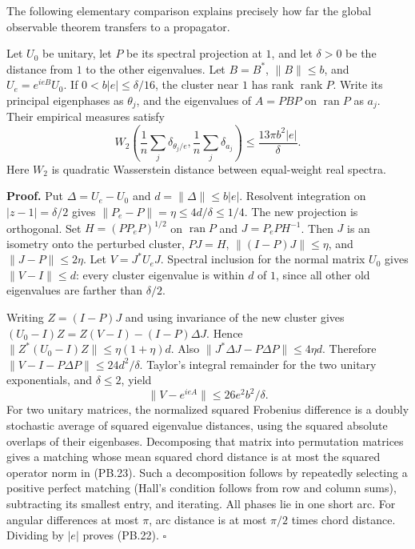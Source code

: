 The following elementary comparison explains precisely how far the global observable theorem transfers to a propagator.

\begin{lemma}\label{pass1:pell_blocks-3} Let \(U_0\) be unitary, let \(P\) be its spectral projection at \(1\), and let \(\delta>0\) be the distance from \(1\) to the other eigenvalues. Let \(B=B^*\), \(\|B\|\leq b\), and \(U_e=e^{ieB}U_0\). If \(0<b|e|\leq\delta/16\), the cluster near \(1\) has rank \(\operatorname{rank}P\). Write its principal eigenphases as \(\theta_j\), and the eigenvalues of \(A=PBP\) on \(\operatorname{ran}P\) as \(a_j\). Their empirical measures satisfy \[
 W_2\left(\frac1n\sum_j\delta_{\theta_j/e},
          \frac1n\sum_j\delta_{a_j}\right)
 \leq\frac{13\pi b^2|e|}{\delta}. \tag{PB.22}
\] Here \(W_2\) is quadratic Wasserstein distance between equal-weight real spectra.
\end{lemma}

\textbf{Proof.} Put \(\Delta=U_e-U_0\) and \(d=\|\Delta\|\leq b|e|\). Resolvent integration on \(|z-1|=\delta/2\) gives \(\|P_e-P\|=\eta\leq4d/\delta\leq1/4\). The new projection is orthogonal. Set \(H=(PP_eP)^{1/2}\) on \(\operatorname{ran}P\) and \(J=P_ePH^{-1}\). Then \(J\) is an isometry onto the perturbed cluster, \(PJ=H\), \(\|(I-P)J\|\leq\eta\), and \(\|J-P\|\leq2\eta\). Let \(V=J^*U_eJ\). Spectral inclusion for the normal matrix \(U_0\) gives \(\|V-I\|\leq d\): every cluster eigenvalue is within \(d\) of \(1\), since all other old eigenvalues are farther than \(\delta/2\).

Writing \(Z=(I-P)J\) and using invariance of the new cluster gives \((U_0-I)Z=Z(V-I)-(I-P)\Delta J\). Hence \(\|Z^*(U_0-I)Z\|\leq\eta(1+\eta)d\). Also \(\|J^*\Delta J-P\Delta P\|\leq4\eta d\). Therefore \(\|V-I-P\Delta P\|\leq24d^2/\delta\). Taylor's integral remainder for the two unitary exponentials, and \(\delta\leq2\), yield \[
 \|V-e^{i e A}\|\leq26 e^2b^2/\delta. \tag{PB.23}
\] For two unitary matrices, the normalized squared Frobenius difference is a doubly stochastic average of squared eigenvalue distances, using the squared absolute overlaps of their eigenbases. Decomposing that matrix into permutation matrices gives a matching whose mean squared chord distance is at most the squared operator norm in (PB.23). Such a decomposition follows by repeatedly selecting a positive perfect matching (Hall's condition follows from row and column sums), subtracting its smallest entry, and iterating. All phases lie in one short arc. For angular differences at most \(\pi\), arc distance is at most \(\pi/2\) times chord distance. Dividing by \(|e|\) proves (PB.22). \(\square\)


